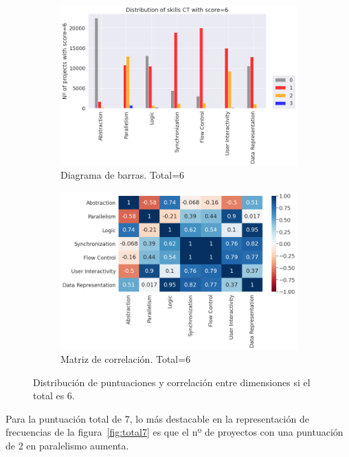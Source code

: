 \documentclass[a4paper, 12pt]{book}
\begin{document}
\begin{figure}
    \centering
    \begin{subfigure}[h]{.49\textwidth} 
        \includegraphics[width=\textwidth]{img/distribucion_6_Scratch}
        \caption{Diagrama de barras. Total=6}
        \label{fig:total6}
    \end{subfigure}       
    \begin{subfigure}[h]{.49\textwidth} 
        \includegraphics[width=\textwidth]{img/corr_6_Scratch}
        \caption{Matriz de correlación. Total=6}
        \label{fig:corr6}
    \end{subfigure}
     \caption{Distribución de puntuaciones y correlación entre dimensiones si el total es 6.}
\end{figure}

Para la puntuación total de 7, lo más destacable en la representación de frecuencias de la figura~\ref{fig:total7} es que el nº de proyectos con una puntuación de 2 en paralelismo aumenta.
\end{document}
